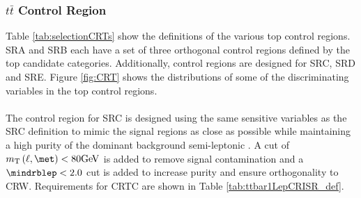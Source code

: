 


\subsubsection{\boldmath$t\bar{t}$ Control Region}

Table \ref{tab:selectionCRTs} show the definitions of the various top control regions. SRA and SRB each have a set of three orthogonal control regions defined by the top candidate categories. Additionally, control regions are designed for SRC, SRD and SRE.  Figure \ref{fig:CRT} shows the distributions of some of the discriminating variables in the top control regions. \\
\\ %

The control region for SRC is designed using the same sensitive variables as the SRC definition to mimic the signal regions as close as possible while maintaining a high purity of the dominant background semi-leptonic \ttbar.  A cut of $\mtlepmet < 80\gev$ is added to remove signal contamination and a $\mindrblep<2.0$ cut is added to increase purity and ensure orthogonality to CRW. Requirements for CRTC are shown in Table \ref{tab:ttbar1LepCRISR_def}. \\


